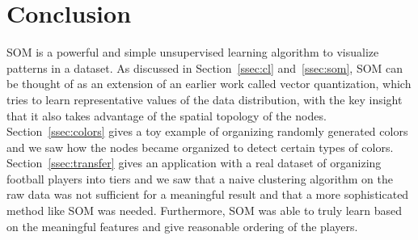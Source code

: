 \section{Conclusion}

SOM is a powerful and simple unsupervised learning algorithm
to visualize patterns in a dataset.
As discussed in Section~\ref{ssec:cl} and~\ref{ssec:som},
SOM can be thought of as an extension of an earlier work called vector quantization,
which tries to learn representative values of the data distribution,
with the key insight that it also takes advantage of the spatial topology of the nodes.
Section~\ref{ssec:colors} gives a toy example of organizing randomly generated colors
and we saw how the nodes became organized to detect certain types of colors.
Section~\ref{ssec:transfer} gives an application with a real dataset 
of organizing football players into tiers and we saw that a naive clustering algorithm on the raw data
was not sufficient for a meaningful result and that a more sophisticated method like SOM was needed.
Furthermore, SOM was able to truly learn based on the meaningful features and give reasonable ordering of the players.
